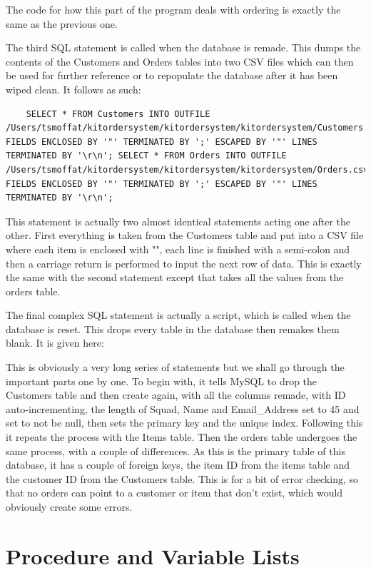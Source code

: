 \documentclass[11pt]{report}
\begin{document}
The code for how this part of the program deals with ordering is exactly the same as the previous one. \par 
The third SQL statement is called when the database is remade. This dumps the contents of the Customers and Orders tables into two CSV  files which can then be used for further reference or to repopulate the database after it has been wiped clean. It follows as such:
\begin{lstlisting}
	SELECT * FROM Customers INTO OUTFILE /Users/tsmoffat/kitordersystem/kitordersystem/kitordersystem/Customers.csv FIELDS ENCLOSED BY '"' TERMINATED BY ';' ESCAPED BY '"' LINES TERMINATED BY '\r\n'; SELECT * FROM Orders INTO OUTFILE /Users/tsmoffat/kitordersystem/kitordersystem/kitordersystem/Orders.csv FIELDS ENCLOSED BY '"' TERMINATED BY ';' ESCAPED BY '"' LINES TERMINATED BY '\r\n';
\end{lstlisting}
This statement is actually two almost identical statements acting one after the other. First everything is taken from the Customers table and put into a CSV file where each item is enclosed with "", each line is finished with a semi-colon and then a carriage return is performed to input the next row of data. This is exactly the same with the second statement except that takes all the values from the orders table.\par The final complex SQL statement is actually a script, which is called when the database is reset. This drops every table in the database then remakes them blank. It is given here:

This is obviously a very long series of statements but we shall go through the important parts one by one. To begin with, it tells MySQL to drop the Customers table and then create again, with all the columns remade, with ID auto-incrementing, the length of Squad, Name and Email\_Address set to 45 and set to not be null, then sets the primary key and the unique index. Following this it repeats the process with the Items table. Then the orders table undergoes the same process, with a couple of differences. As this is the primary table of this database, it has a couple of foreign keys, the item ID from  the items table and the customer ID from the Customers table. This is for a bit of error checking, so that no orders can point to a customer or item that don't exist, which would obviously create some errors. 
\section{Procedure and Variable Lists}
	
\end{document}
